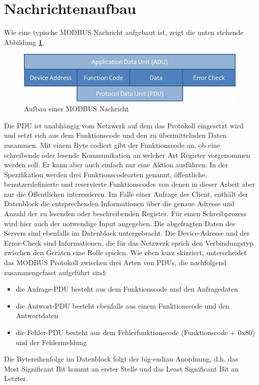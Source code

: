 \section{Nachrichtenaufbau}
Wie eine typische MODBUS Nachricht aufgebaut ist, zeigt die unten stehende Abbildung \textbf{\ref{fig:modbusmessage}}. 
\begin{figure}[h]
\centering
\includegraphics[scale=0.65]{modbus/ADUPDU}
\caption{Aufbau einer MODBUS Nachricht}
\label{fig:modbusmessage}
\end{figure} 
Die PDU ist unabhängig vom Netzwerk auf dem das Protokoll eingesetzt wird und setzt sich aus dem Funktionscode und den zu übermittelnden Daten zusammen. Mit einem Byte codiert gibt der Funktionscode an, ob eine schreibende oder lesende Kommunikation an welcher Art Register vorgenommen werden soll. Er kann aber auch einfach nur eine Aktion ausführen. In der Spezifikation werden drei Funktionscodearten genannt, öffentliche, benutzerdefinierte und reservierte Funktionscodes von denen in dieser Arbeit aber nur die Öffentlichen interessieren. Im Falle einer Anfrage des Client, enthält der Datenblock die entsprechenden Informationen über die genaue Adresse und Anzahl der zu lesenden oder beschreibenden Register. Für einen Schreibprozess wird hier auch der notwendige Input angegeben. Die abgefragten Daten des Servers sind ebenfalls im Datenblock untergebracht. Die Device-Adresse und der Error-Check sind Informationen, die für das Netzwerk sprich den Verbindungstyp zwischen den Geräten eine Rolle spielen. Wie eben kurz skizziert, unterscheidet das MODBUS Protokoll zwischen drei Arten von PDUs, die nachfolgend zusammengefasst aufgeführt sind:
\begin{itemize}
\item die Anfrage-PDU besteht aus dem Funktionscode und den Anfragedaten
\item die Antwort-PDU besteht ebenfalls aus einem Funktionscode und den Antwortdaten
\item die Fehler-PDU besteht aus dem Fehlerfunktionscode (Funktionscode + 0x80) und der Fehlermeldung 
\end{itemize}
Die Bytereihenfolge im Datenblock folgt der big-endian Anordnung, d.h. das Most Significant Bit kommt an erster Stelle und das Least Significant Bit an Letzter. 
